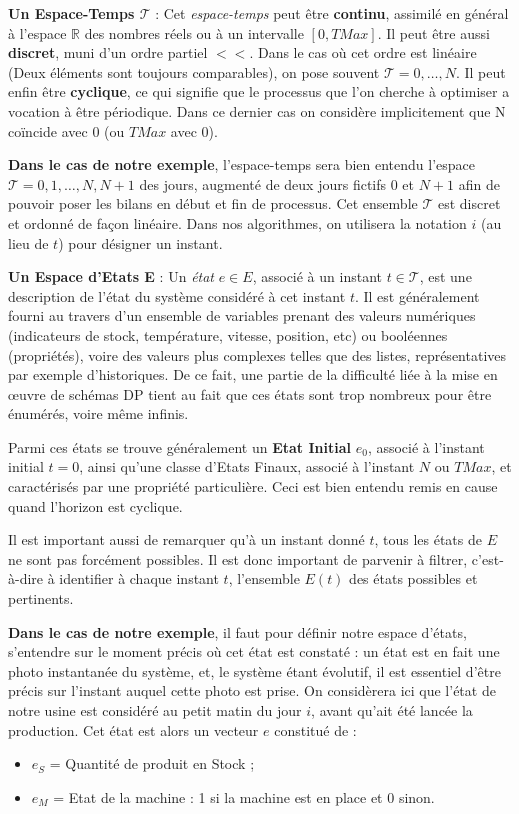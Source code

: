 \textbf{Un Espace-Temps $\mathcal{T}$} : Cet \textit{espace-temps} peut être \textbf{continu}, assimilé en général à l'espace $\mathbb{R}$  des nombres réels ou à un intervalle $[0, TMax]$. Il peut être aussi \textbf{discret}, muni d'un ordre partiel $<<$. Dans le cas où cet ordre est linéaire (Deux éléments sont toujours comparables), on pose souvent $\mathcal{T} = {0,\dots, N}$. Il peut enfin être \textbf{cyclique}, ce qui signifie que le processus que l'on cherche à optimiser a vocation à être périodique. Dans ce dernier cas on considère implicitement que N coïncide avec $0$ (ou $TMax$ avec $0$). 

\textbf{Dans le cas de notre exemple}, l'espace-temps sera bien entendu l'espace $\mathcal{T} = {0, 1, \dots, N, N+1}$ des jours, augmenté de deux jours fictifs $0$ et $N+1$ afin de pouvoir poser les bilans en début et fin de processus. Cet ensemble $\mathcal{T}$ est discret et ordonné de façon linéaire. Dans nos algorithmes, on utilisera la notation $i$ (au lieu de $t$) pour désigner un instant.

\textbf{Un Espace d'Etats E} : Un \textit{état} $e \in E$, associé à un instant $t \in \mathcal{T}$, est une description de l'état du système considéré à cet instant $t$. Il est généralement fourni au travers d'un ensemble de variables prenant des valeurs numériques (indicateurs de stock, température, vitesse, position, etc) ou booléennes (propriétés), voire des valeurs plus complexes telles que des listes, représentatives par exemple d'historiques.  De ce fait, une partie de la difficulté liée à la mise en œuvre de schémas DP tient au fait que ces états sont trop nombreux pour être énumérés, voire même infinis. 

Parmi ces états se trouve généralement un \textbf{Etat Initial} $e_0$, associé à l'instant initial $t = 0$, ainsi qu'une classe d'Etats Finaux, associé à l'instant $N$ ou $TMax$, et caractérisés par une propriété particulière. Ceci est bien entendu remis en cause quand l'horizon est cyclique.  

Il est important aussi de remarquer qu'à un instant donné $t$, tous les états de $E$ ne sont pas forcément possibles. Il est donc important de parvenir à filtrer, c'est-à-dire à identifier à chaque instant $t$, l'ensemble $E(t)$  des états possibles et pertinents.

\textbf{Dans le cas de notre exemple}, il faut pour définir notre espace d'états, s'entendre sur le moment précis où cet état est constaté : un état est en fait une photo instantanée du système, et, le système étant évolutif, il est essentiel d'être précis sur l'instant auquel cette photo est prise. On considèrera ici que l'état de notre usine est considéré au petit matin du jour $i$, avant qu'ait été lancée la production. Cet état est alors un vecteur $e$ constitué de :
\begin{itemize}[label=$\square$]
	\item 	$e_S$ = Quantité de produit en Stock ;
	\item $e_M$ = Etat de la machine : 1 si la machine est en place et 0 sinon.
\end{itemize}

